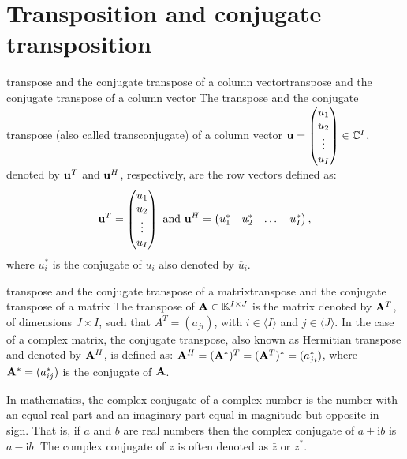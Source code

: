 \section{Transposition and conjugate transposition}
\begin{definition}{transpose and the conjugate transpose of a column vector}{transpose and the conjugate transpose of a column vector}
    The transpose and the conjugate transpose (also called transconjugate) of a column
    vector $\bold{u}=\begin{pmatrix}u_1\\ u_{2} \\ \vdots \\ u_{I} \end{pmatrix}\in \mathbb{C}^{I}$, 
    denoted by $\bold{u}^{T}$ and $\bold{u}^{H}$, respectively, are the row vectors defined as:
    \begin{align*}
        \bold{u}^T=\begin{pmatrix}u_1\\ u_{2} \\ \vdots \\ u_{I} \end{pmatrix}\text{ and } 
        \bold{u}^H=\begin{pmatrix}u_1^*& u_{2}^* & \dots & u_{I}^* \end{pmatrix},
    \end{align*}
    where $u_i^*$ is the conjugate of $u_i$ also denoted by $\overline{u}_i$.
\end{definition}

\begin{definition}{transpose and the conjugate transpose of a matrix}{transpose and the conjugate transpose of a matrix}
    The transpose of $\bold{A}\in\mathbb{K}^{I\times J}$ is the matrix denoted by $\bold{A}^T$, of dimensions $J\times I$, such that $A^T=(a_{ji})$, 
    with $i\in\langle {I}\rangle$ and $j\in\langle {J}\rangle$.
    In the case of a complex matrix, the conjugate transpose, also known as Hermitian transpose and denoted by $\bold{A}^H$,
    is defined as: $\bold{A}^{H}=(\bold{A}^*)^T=(\bold{A}^T)^*=(a_{ji}^*)$,
    where $\bold{A}^*=(a_{ij}^*)$ is the conjugate of $\bold{A}$.
\end{definition}

\begin{remark}
    In mathematics, the complex conjugate of a complex number 
    is the number with an equal real part and 
    an imaginary part equal in magnitude but opposite in sign. 
    That is, if $a$ and $b$ are real numbers 
    then the complex conjugate of $a+\text{i}b$ is $a-\text{i}b$.
    The complex conjugate of $z$ is often denoted as $\bar{z}$ or $z^*$.
\end{remark}


